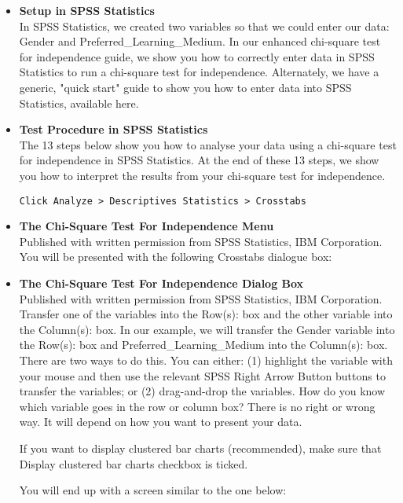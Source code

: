 \documentclass[]{report}
\begin{document}
\begin{itemize}
\item \textbf{Setup in SPSS Statistics} \\
In SPSS Statistics, we created two variables so that we could enter our data: Gender and Preferred\_Learning\_Medium. In our enhanced chi-square test for independence guide, we show you how to correctly enter data in SPSS Statistics to run a chi-square test for independence. Alternately, we have a generic, "quick start" guide to show you how to enter data into SPSS Statistics, available here.

\item \textbf{Test Procedure in SPSS Statistics} \\
The 13 steps below show you how to analyse your data using a chi-square test for independence in SPSS Statistics. At the end of these 13 steps, we show you how to interpret the results from your chi-square test for independence.

\begin{verbatim}
Click Analyze > Descriptives Statistics > Crosstabs
\end{verbatim}

\item \textbf{The Chi-Square Test For Independence Menu} \\
Published with written permission from SPSS Statistics, IBM Corporation.
You will be presented with the following Crosstabs dialogue box:

\item \textbf{The Chi-Square Test For Independence Dialog Box} \\
Published with written permission from SPSS Statistics, IBM Corporation.
Transfer one of the variables into the Row(s): box and the other variable into the Column(s): box. In our example, we will transfer the Gender variable into the Row(s): box and Preferred\_Learning\_Medium into the Column(s): box. There are two ways to do this. You can either: (1) highlight the variable with your mouse and then use the relevant SPSS Right Arrow Button buttons to transfer the variables; or (2) drag-and-drop the variables. How do you know which variable goes in the row or column box? There is no right or wrong way. It will depend on how you want to present your data.

If you want to display clustered bar charts (recommended), make sure that Display clustered bar charts checkbox is ticked.

You will end up with a screen similar to the one below:


\end{itemize}
\end{document}
